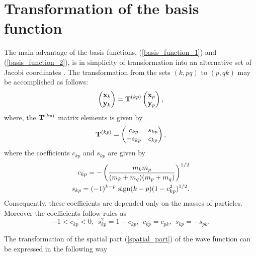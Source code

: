 \documentclass[
12pt, %
oneside, %
english, %
onehalfspacing, %
onehalfspacing, %
headsepline, %
]{MastersDoctoralThesis} %
\begin{document}
 \section{Transformation of the basis function }
The main advantage of the basis functions,  (\ref{basis_function_1}) and (\ref{basis_function_2}), is in simplicity of transformation into an alternative set of Jacobi coordinates \cite{suzuki1998stochastic}.
The transformation from the sets $(k,pq)$ to $(p,qk)$ may be accomplished as follows:
\begin{equation}
\begin{pmatrix}
{\bf x}_k \\ 
{\bf y}_k
\end{pmatrix}  = {\bf T}^{(kp)}
\begin{pmatrix}
{\bf x}_p \\ 
{\bf y}_p
\end{pmatrix},
\end{equation}
where, the ${\bf T}^{(kp)}$ matrix elements is given by \cite{faddeev1985quantum}
\begin{equation}
{\bf T}^{(kp)} = 
 \begin{pmatrix}
 c_{kp}&s_{kp} \\
 -s_{kp}&c_{kp} \\
 \end{pmatrix},
\end{equation}
where the coefficients $c_{kp}$ and $s_{kp}$ are given by 
\begin{align}
c_{kp}=-\left( \frac{m_k m_p}{(m_k+m_q)(m_p+m_q)} \right)^{1/2} \\
s_{kp}=(-1)^{k-p}~{\rm sign} (k-p) (1-c^2_{kp})^{1/2}.
\end{align} 
Consequently, these coefficients are depended only on the masses of particles. Moreover the coefficients follow rules as
\begin{equation}
-1<c_{kp}<0,~~s^2_{kp}=1-c_{kp},~~c_{kp}=c_{pk},~~ s_{kp}=-s_{pk}.
\end{equation}


The transformation of the spatial part (\ref{spatial_part}) of the wave function can be expressed in the following way \cite{suzuki1998stochastic, kukulin1990dynamic}
\end{document}
